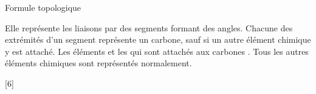 \begin{doc}{Formule topologique}
  \begin{importants}  
    Elle représente les liaisons  par des segments formant des angles.
    Chacune des extrémités d'un segment représente un carbone, sauf si un autre élément chimique y est attaché.
    Les éléments  et les  qui sont attachés aux carbones .
    Tous les autres éléments chimiques sont représentés normalement.
  \end{importants}

  \exemple*
  \vspace*{-20pt}
  \begin{center}
    \qq{}
    \qq{}
  \end{center}
\end{doc}

[6]